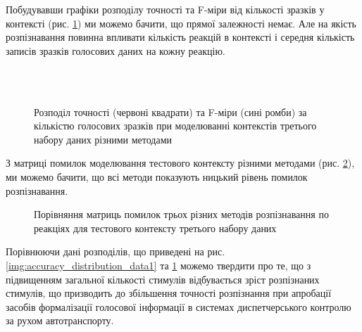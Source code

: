Побудувавши графіки розподілу точності та F-міри від кількості зразків у контексті (рис. \ref{img:accuracy_distribution_data3}) ми можемо бачити, що прямої залежності немає. Але на якість розпізнавання повинна впливати кількість реакцій в контексті і середня кількість записів зразків голосових даних на кожну реакцію.

\begin{figure}[!t]
	\centering
	\\
	\\
	\caption{Розподіл точності (червоні квадрати) та F-міри (сині ромби) за кількістю голосових зразків при моделюванні контекстів третього набору даних різними методами}
	\label{img:accuracy_distribution_data3}
\end{figure}

З матриці помилок моделювання тестового контексту різними методами (рис. \ref{img:confusion_matrix_data3_context_21}), ми можемо бачити, що всі методи показують ницький рівень помилок розпізнавання.

\begin{figure}
	\centering
	
	\caption{Порівняння матриць помилок трьох різних методів розпізнавання по реакціях для тестового контексту третього набору даних}
	\label{img:confusion_matrix_data3_context_21}
\end{figure}

Порівнюючи дані розподілів, що приведені на рис. \ref{img:accuracy_distribution_data1} та \ref{img:accuracy_distribution_data3} можемо твердити про те, що з підвищенням загальної кількості стимулів відбувається зріст розпізнаних стимулів, що призводить до збільшення точності розпізнання при апробації засобів формалізації голосової інформації в системах диспетчерського контролю за рухом автотранспорту.


